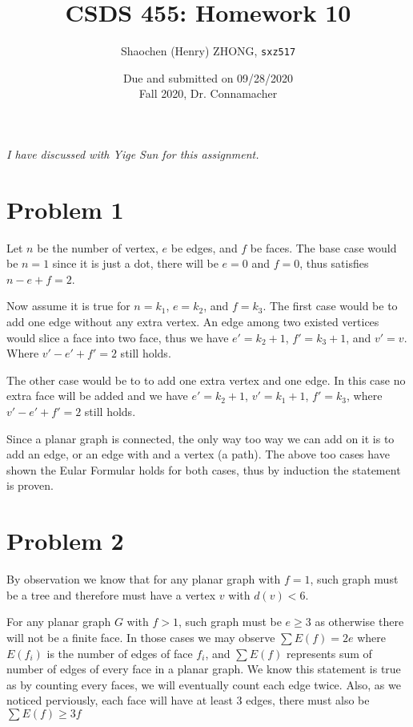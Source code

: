 \documentclass[11pt]{article}
\newcommand{\ilc}{\texttt}
\begin{document}
\title{\textbf{CSDS 455: Homework 10}}

\author{Shaochen (Henry) ZHONG, \ilc{sxz517}}
\date{Due and submitted on 09/28/2020 \\ Fall 2020, Dr. Connamacher}
\maketitle

\textit{I have discussed with Yige Sun for this assignment.}

\section*{Problem 1}

Let $n$ be the number of vertex, $e$ be edges, and $f$ be faces. The base case would be $n = 1$ since it is just a dot, there will be $e = 0$ and $f = 0$, thus satisfies $n - e + f = 2$.\newline

Now assume it is true for $n = k_1$, $e = k_2$, and $f = k_3$. The first case would be to add one edge without any extra vertex. An edge among two existed vertices would slice a face into two face, thus we have $e' = k_2 + 1$, $f' = k_3 +1$, and $v' = v$. Where $v' - e' + f' = 2$ still holds.

The other case would be to to add one extra vertex and one edge. In this case no extra face will be added and we have $e' = k_2 + 1$, $v' = k_1 + 1$, $f' = k_3$, where $v' - e' + f' = 2$ still holds.

Since a planar graph is connected, the only way too way we can add on it is to add an edge, or an edge with and a vertex (a path). The above too cases have shown the Eular Formular holds for both cases, thus by induction the statement is proven.

\section*{Problem 2}

By observation we know that for any planar graph with $f = 1$, such graph must be a tree and therefore must have a vertex $v$ with $d(v) < 6$.\newline

For any planar graph $G$ with $f > 1$, such graph must be $e \geq 3$ as otherwise there will not be a finite face. In those cases we may observe $\sum E(f) = 2e$ where $E(f_i)$ is the number of edges of face $f_i$, and $\sum E(f)$ represents sum of number of edges of every face in a planar graph. We know this statement is true as by counting every faces, we will eventually count each edge twice. Also, as we noticed perviously, each face will have at least 3 edges, there must also be $\sum E(f) \geq 3f$\newline
\end{document}
